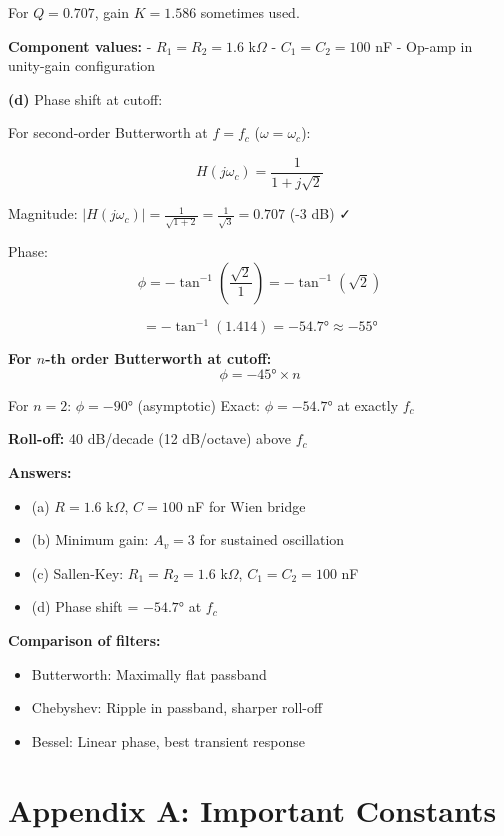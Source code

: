 \documentclass[12pt,a4paper]{article}
\begin{document}
\begin{solution}
For $Q = 0.707$, gain $K = 1.586$ sometimes used.

\textbf{Component values:}
- $R_1 = R_2 = 1.6$ k$\Omega$
- $C_1 = C_2 = 100$ nF
- Op-amp in unity-gain configuration

\textbf{(d)} Phase shift at cutoff:

For second-order Butterworth at $f = f_c$ ($\omega = \omega_c$):

$$H(j\omega_c) = \frac{1}{1 + j\sqrt{2}}$$

Magnitude: $|H(j\omega_c)| = \frac{1}{\sqrt{1 + 2}} = \frac{1}{\sqrt{3}} = 0.707$ (-3 dB) ✓

Phase:
$$\phi = -\tan^{-1}\left(\frac{\sqrt{2}}{1}\right) = -\tan^{-1}(\sqrt{2})$$

$$= -\tan^{-1}(1.414) = -54.7° \approx -55°$$

\textbf{For $n$-th order Butterworth at cutoff:}
$$\phi = -45° \times n$$

For $n = 2$: $\phi = -90°$ (asymptotic)
Exact: $\phi = -54.7°$ at exactly $f_c$

\textbf{Roll-off:} 40 dB/decade (12 dB/octave) above $f_c$

\textbf{Answers:}
\begin{itemize}
    \item (a) $R = 1.6$ k$\Omega$, $C = 100$ nF for Wien bridge
    \item (b) Minimum gain: $A_v = 3$ for sustained oscillation
    \item (c) Sallen-Key: $R_1 = R_2 = 1.6$ k$\Omega$, $C_1 = C_2 = 100$ nF
    \item (d) Phase shift = $-54.7°$ at $f_c$
\end{itemize}

\textbf{Comparison of filters:}
\begin{itemize}
    \item Butterworth: Maximally flat passband
    \item Chebyshev: Ripple in passband, sharper roll-off
    \item Bessel: Linear phase, best transient response
\end{itemize}
\end{solution}

\newpage

\section*{Appendix A: Important Constants}
\end{document}
